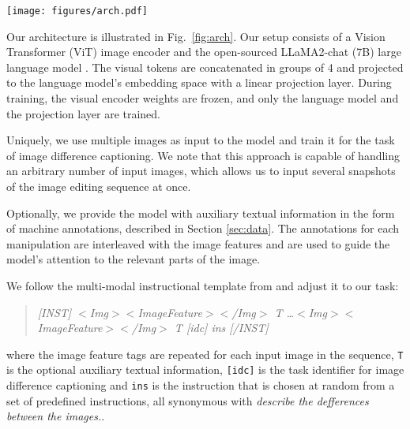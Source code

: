 \documentclass[10pt,twocolumn,letterpaper]{article}
\begin{document}
\begin{figure*}[ht]
    \centering
    \texttt{[image: figures/arch.pdf]}
    \caption{Architecture diagram of the model. The LLaMA-2 language model is
         conditioned using the multi-modal instruction template, which includes
         at least two image features and optional auxiliary textual information. All optional content is placed within dashed boxes.
         The image features extracted from the ViT image encoder are concatenated in groups of 4 and projected to the LLM embedding space with a linear projection layer.
    The visual encoder weights are frozen, and only the language model and the projection layer are trained.}
    \label{fig:arch}
    
\end{figure*}



Our architecture is illustrated in Fig.~\ref{fig:arch}. Our
setup consists of a Vision Transformer (ViT) \cite{vit} image encoder and the
open-sourced LLaMA2-chat (7B) large language model \cite{llama2}. The visual
tokens are concatenated in groups of 4 and projected to the language model's
embedding space with a linear projection layer. During training, the visual
encoder weights are frozen, and only the language model and the projection layer
are trained.

Uniquely, we use multiple images as input to the model and train it for the
task of image difference captioning. We note that this approach is capable of
handling an arbitrary number of input images, which allows us to input several
snapshots of the image editing sequence at once.

Optionally, we provide the model with auxiliary textual information in the form
of machine annotations, described in Section \ref{sec:data}. The annotations
for each manipulation are interleaved with the image features and are used to
guide the model's attention to the relevant parts of the image. 

We follow the multi-modal instructional template from \cite{minigpt} and
adjust it to our task:

\begin{quote}
     \centering
    \tiny
    \textit{[INST] $<$Img$>$$<$ImageFeature$>$$<$/Img$>$ T \ldots $<$Img$>$$<$ImageFeature$>$$<$/Img$>$ T [idc] ins [/INST]}
\end{quote}

where the image feature tags are repeated for each input image in the sequence, 
\texttt{T} is the optional auxiliary textual information,
\texttt{[idc]} is the task identifier for image difference captioning and
\texttt{ins} is the instruction that is chosen at random from a set of
predefined instructions, all synonymous with \textit{describe the defferences between the images.}.
\end{document}
